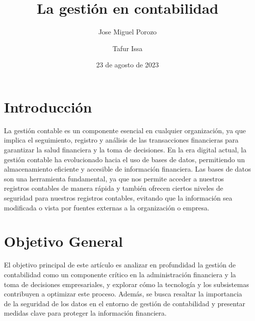 \documentclass{article}
\title{La gestión en contabilidad}
\author{Jose Miguel Porozo \and Tafur Issa}
\date{23 de agosto de 2023}
\begin{document}
\maketitle

\section{Introducción}
La gestión contable es un componente esencial en cualquier organización, ya que implica el seguimiento, registro y análisis de las transacciones financieras para garantizar la salud financiera y la toma de decisiones. En la era digital actual, la gestión contable ha evolucionado hacia el uso de bases de datos, permitiendo un almacenamiento eficiente y accesible de información financiera. Las bases de datos son una herramienta fundamental, ya que nos permite acceder a nuestros registros contables de manera rápida y también ofrecen ciertos niveles de seguridad para nuestros registros contables, evitando que la información sea modificada o vista por fuentes externas a la organización o empresa.

\section{Objetivo General}
El objetivo principal de este artículo es analizar en profundidad la gestión de contabilidad como un componente crítico en la administración financiera y la toma de decisiones empresariales, y explorar cómo la tecnología y los subsistemas contribuyen a optimizar este proceso. Además, se busca resaltar la importancia de la seguridad de los datos en el entorno de gestión de contabilidad y presentar medidas clave para proteger la información financiera.
\end{document}
